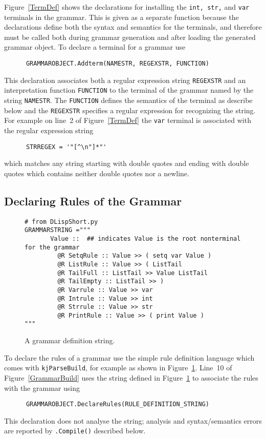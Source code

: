 Figure~\ref{TermDef} shows the declarations for installing
the {\tt int, str,} and {\tt var} terminals in the grammar.
This is given as a separate function because the declarations
define both the syntax and semantics for the terminals,
and therefore must be called both during grammar generation
and after loading the generated grammar object.
To declare a terminal for a grammar use
\begin{verbatim}
      GRAMMAROBJECT.Addterm(NAMESTR, REGEXSTR, FUNCTION)
\end{verbatim}
This declaration associates both a regular expression string
{\tt REGEXSTR}
and an interpretation function {\tt FUNCTION} to the
terminal of the grammar named by the string {\tt NAMESTR}.
The {\tt FUNCTION} defines the semantics of the terminal
as describe below and the {\tt REGEXSTR} specifies a regular
expression for recognizing the string.  For example on
line~2 of Figure~\ref{TermDef} the {\tt var} terminal
is associated with the regular expression string
\begin{verbatim}
      STRREGEX = '"[^\n"]*"'
\end{verbatim}
which matches any string starting with double quotes and ending
with double quotes which contains neither double quotes nor
a newline.

\subsection{Declaring Rules of the Grammar}


\begin{figure}
\begin{center}
\begin{verbatim}
# from DLispShort.py
GRAMMARSTRING ="""
       Value ::  ## indicates Value is the root nonterminal for the grammar
         @R SetqRule :: Value >> ( setq var Value )
         @R ListRule :: Value >> ( ListTail
         @R TailFull :: ListTail >> Value ListTail
         @R TailEmpty :: ListTail >> )
         @R Varrule :: Value >> var
         @R Intrule :: Value >> int
         @R Strrule :: Value >> str
         @R PrintRule :: Value >> ( print Value )
"""
\end{verbatim}
\end{center}
\caption{A grammar definition string. \label{GramStr} }
\end{figure}

To declare the rules of a grammar use the simple rule
definition language which comes with {\tt kjParseBuild}, for example
as shown in Figure~\ref{GramStr}.  Line~10 of 
Figure~\ref{GrammarBuild} uses the string defined in
Figure~\ref{GramStr} to associate the rules with the
grammar using
\begin{verbatim}
      GRAMMAROBJECT.DeclareRules(RULE_DEFINITION_STRING)
\end{verbatim}
This declaration does not analyse the string; analysis
and syntax/semantics errors are reported by {\tt *.Compile()}
described below.

